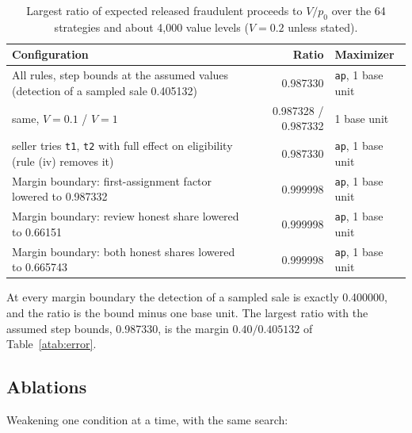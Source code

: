 \documentclass[10pt,a4paper]{article}
\theoremstyle{plain}
\theoremstyle{remark}
\begin{document}
\begin{table}[!htbp]
\centering
\caption{Largest ratio of expected released fraudulent proceeds to $V/p_0$ over the 64 strategies and about 4,000 value levels ($V=0.2$ unless stated).}
\label{tab:search}
\footnotesize
\begin{tabular}{@{}p{8.4cm}rl@{}}
\toprule
Configuration & Ratio & Maximizer \\
\midrule
All rules, step bounds at the assumed values (detection of a sampled sale 0.405132) & 0.987330 & \texttt{ap}, 1 base unit \\
\quad same, $V=0.1$ / $V=1$ & 0.987328 / 0.987332 & 1 base unit \\
\quad seller tries \texttt{t1}, \texttt{t2} with full effect on eligibility (rule (iv) removes it) & 0.987330 & \texttt{ap}, 1 base unit \\
Margin boundary: first-assignment factor lowered to 0.987332 & 0.999998 & \texttt{ap}, 1 base unit \\
Margin boundary: review honest share lowered to 0.66151 & 0.999998 & \texttt{ap}, 1 base unit \\
Margin boundary: both honest shares lowered to 0.665743 & 0.999998 & \texttt{ap}, 1 base unit \\
\bottomrule
\end{tabular}
\end{table}

At every margin boundary the detection of a sampled sale is exactly 0.400000, and the ratio is the bound minus one base unit. The largest ratio with the assumed step bounds, 0.987330, is the margin $0.40/0.405132$ of Table~\ref{atab:error}.

\subsection{Ablations}

Weakening one condition at a time, with the same search:
\end{document}
